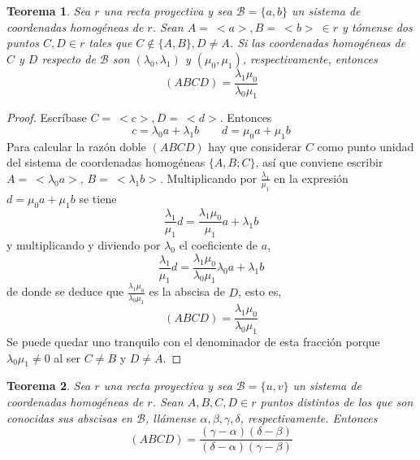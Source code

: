 \documentclass[12pt]{report}
\newtheorem{theorem}{Teorema}[chapter]
\theoremstyle{definition}
\theoremstyle{definition}
\theoremstyle{remark}
\begin{document}
\begin{theorem}
\label{teo2.3.}
Sea $r$ una recta proyectiva y sea $\mathcal{B} = \{a,b\}$ un sistema de coordenadas homogéneas de $r$. Sean $A = \ <a>, B = \ <b> \ \in r$ y tómense dos puntos $C,D \in r$ tales que $C \notin \{A,B\}, D \neq A$. Si las coordenadas homogéneas de $C$ y $D$ respecto de $\mathcal{B}$ son $(\lambda_0,\lambda_1)$ y $(\mu_0,\mu_1)$, respectivamente, entonces
\[(ABCD) = \frac{\lambda_1 \mu_0}{\lambda_0 \mu_1}\]
\end{theorem}

\begin{proof}
Escríbase $C = \ <c>, D = \ <d>$. Entonces
\[c = \lambda_0 a + \lambda_1 b \qquad d = \mu_0 a + \mu_1 b\]
Para calcular la razón doble $(ABCD)$ hay que considerar $C$ como punto unidad del sistema de coordenadas homogéneas $\{A,B;C\}$, así que conviene escribir $A = \ <\lambda_0 a>$, $B = \ <\lambda_1 b>$. Multiplicando por $\frac{\lambda_1}{\mu_1}$ en la expresión $d = \mu_0 a + \mu_1 b$ se tiene
\[\frac{\lambda_1}{\mu_1} d = \frac{\lambda_1\mu_0}{\mu_1} a + \lambda_1 b\]
y multiplicando y diviendo por $\lambda_0$ el coeficiente de $a$,
\[\frac{\lambda_1}{\mu_1} d = \frac{\lambda_1\mu_0}{\lambda_0 \mu_1} \lambda_0 a + \lambda_1 b\]
de donde se deduce que $\frac{\lambda_1\mu_0}{\lambda_0 \mu_1}$ es la abscisa de $D$, esto es,
\[(ABCD) = \frac{\lambda_1\mu_0}{\lambda_0 \mu_1}\]
Se puede quedar uno tranquilo con el denominador de esta fracción porque $\lambda_0 \mu_1 \neq 0$ al ser $C \neq B$ y $D \neq A$.
\end{proof}

\begin{theorem}
Sea $r$ una recta proyectiva y sea $\mathcal{B} = \{u,v\}$ un sistema de coordenadas homogéneas de $r$. Sean $A,B,C,D \in r$ puntos distintos de los que son conocidas sus abscisas en $\mathcal{B}$, llámense $\alpha, \beta, \gamma, \delta$, respectivamente. Entonces
\[(ABCD) = \frac{(\gamma - \alpha)(\delta - \beta)}{(\delta - \alpha)(\gamma - \beta)}\]
\end{theorem}
\end{document}
